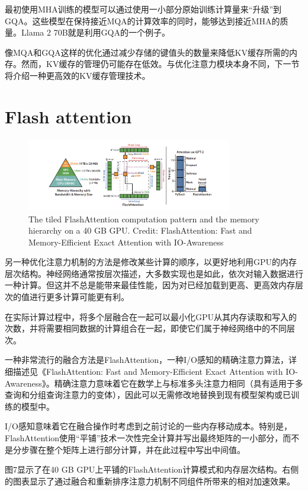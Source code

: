 \documentclass[twocolumn, 10pt]{article} %
\theoremstyle{remark}
\begin{document}
最初使用MHA训练的模型可以通过使用一小部分原始训练计算量来“升级”到GQA。这些模型在保持接近MQA的计算效率的同时，能够达到接近MHA的质量。Llama 2 70B就是利用GQA的一个例子。

像MQA和GQA这样的优化通过减少存储的键值头的数量来降低KV缓存所需的内存。然而，KV缓存的管理仍可能存在低效。与优化注意力模块本身不同，下一节将介绍一种更高效的KV缓存管理技术。


\section{Flash attention}

\begin{figure}[ht]
    \centering
    \includegraphics[width=0.8\textwidth]{flash-attention-computation-pattern-memory-hierarchy-gpu.png}
    \caption{The tiled FlashAttention computation pattern and the memory hierarchy on a 40 GB GPU. Credit: FlashAttention: Fast and Memory-Efficient Exact Attention with IO-Awareness}
\end{figure}


另一种优化注意力机制的方法是修改某些计算的顺序，以更好地利用GPU的内存层次结构。神经网络通常按层次描述，大多数实现也是如此，依次对输入数据进行一种计算。但这并不总是能带来最佳性能，因为对已经加载到更高、更高效内存层次的值进行更多计算可能更有利。

在实际计算过程中，将多个层融合在一起可以最小化GPU从其内存读取和写入的次数，并将需要相同数据的计算组合在一起，即使它们属于神经网络中的不同层次。

一种非常流行的融合方法是FlashAttention，一种I/O感知的精确注意力算法，详细描述见《FlashAttention: Fast and Memory-Efficient Exact Attention with IO-Awareness》。精确注意力意味着它在数学上与标准多头注意力相同（具有适用于多查询和分组查询注意力的变体），因此可以无需修改地替换到现有模型架构或已训练的模型中。

I/O感知意味着它在融合操作时考虑到之前讨论的一些内存移动成本。特别是，FlashAttention使用“平铺”技术一次性完全计算并写出最终矩阵的一小部分，而不是分步骤在整个矩阵上进行部分计算，并在此过程中写出中间值。

图7显示了在40 GB GPU上平铺的FlashAttention计算模式和内存层次结构。右侧的图表显示了通过融合和重新排序注意力机制不同组件所带来的相对加速效果。
\end{document}
